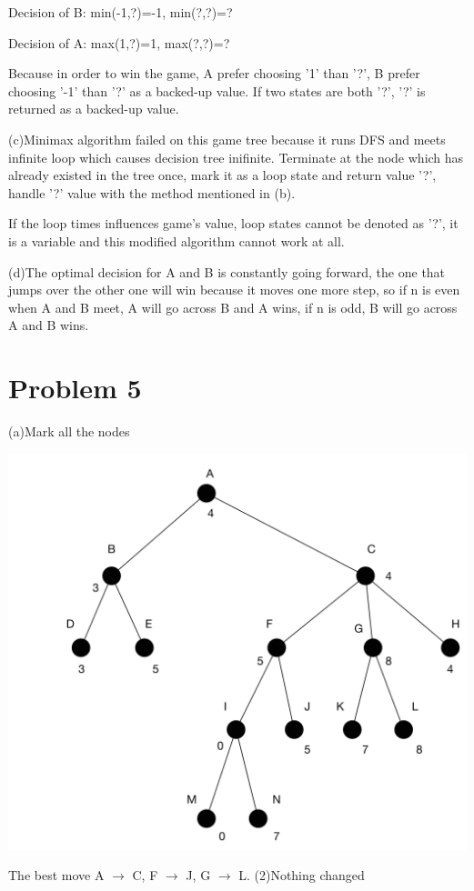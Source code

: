 \documentclass[12pt]{amsart}
\begin{document}
Decision of B: min(-1,?)=-1, min(?,?)=?

Decision of A: max(1,?)=1, max(?,?)=?

Because in order to win the game, A prefer choosing '1' than '?', B prefer choosing '-1' than '?' as a backed-up value. If two states are both '?', '?' is returned as a backed-up value.


(c)Minimax algorithm failed on this game tree because it runs DFS and meets infinite loop which causes decision tree inifinite. Terminate at the node which has already existed in the tree once, mark it as a loop state and return value '?', handle '?' value with the method mentioned in (b).

If the loop times influences game's value, loop states cannot be denoted as '?', it is a variable and this modified algorithm cannot work at all.

(d)The optimal decision for A and B is constantly going forward, the one that jumps over the other one will win because it moves one more step, so if n is even when A and B meet, A will go across B and A wins, if n is odd, B will go across A and B wins.
\newpage
\section*{Problem 5}
(a)Mark all the nodes 

\includegraphics[width=\textwidth]{Problem5a.png}

The best move A $\to$ C, F $\to$ J, G $\to$ L.
\newpage
(2)Nothing changed
\end{document}
